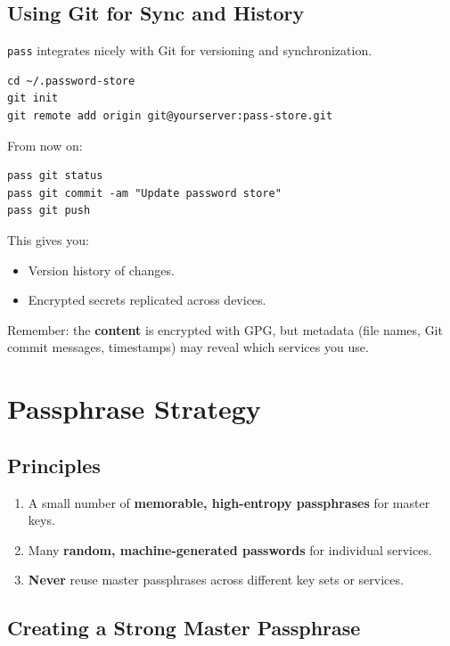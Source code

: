 \documentclass[11pt,a4paper]{article}
\begin{document}
\subsection{Using Git for Sync and History}

\texttt{pass} integrates nicely with Git for versioning and synchronization.

\begin{verbatim}
cd ~/.password-store
git init
git remote add origin git@yourserver:pass-store.git
\end{verbatim}

From now on:

\begin{verbatim}
pass git status
pass git commit -am "Update password store"
pass git push
\end{verbatim}

This gives you:

\begin{itemize}[noitemsep]
  \item Version history of changes.
  \item Encrypted secrets replicated across devices.
\end{itemize}

Remember: the \textbf{content} is encrypted with GPG, but metadata (file names, Git commit messages, timestamps) may reveal which services you use.

\section{Passphrase Strategy}
\label{sec:passphrase-strategy}

\subsection{Principles}

\begin{enumerate}[noitemsep]
  \item A small number of \textbf{memorable, high-entropy passphrases} for master keys.
  \item Many \textbf{random, machine-generated passwords} for individual services.
  \item \textbf{Never} reuse master passphrases across different key sets or services.
\end{enumerate}

\subsection{Creating a Strong Master Passphrase}
\end{document}
